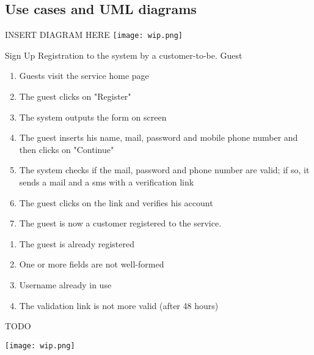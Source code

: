 
\pagebreak
\subsection{Use cases and UML diagrams}
INSERT DIAGRAM HERE
\texttt{[image: wip.png]}
\pagebreak

\usecase
{Sign Up}
{Registration to the system by a customer-to-be.}
{Guest}
{
\begin{enumerate}
	\item Guests visit the service home page
	\item The guest clicks on "Register"
	\item The system outputs the form on screen
	\item The guest inserts his name, mail, password and mobile phone number and then clicks on "Continue"
	\item The system checks if the mail, password and phone number are valid; if so, it sends a mail and a sms with a verification link
	\item The guest clicks on the link and verifies his account
	\item The guest is now a customer registered to the service. 
\end{enumerate}
}
{
\begin{enumerate}
	\item The guest is already registered
	\item One or more fields are not well-formed
	\item Username already in use
    \item The validation link is not more valid (after 48 hours)
\end{enumerate}
}
{ TODO }

\pagebreak
\texttt{[image: wip.png]}

